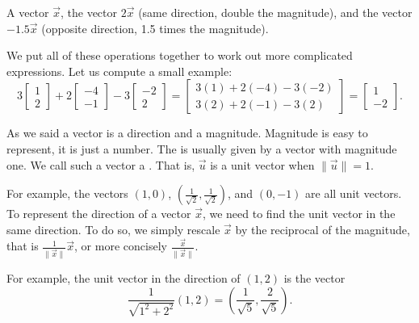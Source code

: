 \documentclass{ximera}
\begin{document}
\begin{myfig}
    \capstart
    
    \caption{A vector $\vec{x}$, the vector $2\vec{x}$ (same direction, double the magnitude), and the vector $-1.5\vec{x}$ (opposite direction, 1.5 times the magnitude).\label{linalg-vecscale:fig}}
\end{myfig}

We put all of these operations together to work out more complicated expressions. Let us compute a small example:
\begin{equation*}
    3
    \begin{bmatrix}
        1 \\ 2
    \end{bmatrix}
    + 2
    \begin{bmatrix}
        -4 \\ -1
    \end{bmatrix} 
    - 3
    \begin{bmatrix}
        -2 \\ 2
    \end{bmatrix} 
    =
    \begin{bmatrix}
        3(1)+2(-4)-3(-2) \\ 3(2)+2(-1)-3(2)
    \end{bmatrix}
    =
    \begin{bmatrix}
        1 \\ -2
    \end{bmatrix}
    .
\end{equation*}

\medskip

As we said a vector is a direction and a magnitude.  Magnitude is easy to represent, it is just a number.  The \emph{} is usually given by a vector with magnitude one.  We call such a vector a \emph{}.  That is, $\vec{u}$ is a unit vector when $\lVert \vec{u} \rVert = 1$.  

For example, the vectors $(1,0)$, $(\frac{1}{\sqrt{2}},\frac{1}{\sqrt{2}})$, and $(0,-1)$ are all unit vectors. To represent the direction of a vector $\vec{x}$, we need to find the unit vector in the same direction.  To do so, we simply rescale $\vec{x}$ by the reciprocal of the magnitude, that is $\frac{1}{\lVert \vec{x} \rVert} \vec{x}$, or more concisely $\frac{\vec{x}}{\lVert \vec{x} \rVert}$. 

For example, the unit vector in the direction of $(1,2)$ is the vector
\begin{equation*}
    \frac{1}{\sqrt{1^2+2^2}} (1,2) = \left( \frac{1}{\sqrt{5}}, \frac{2}{\sqrt{5}} \right) .
\end{equation*}
\end{document}
